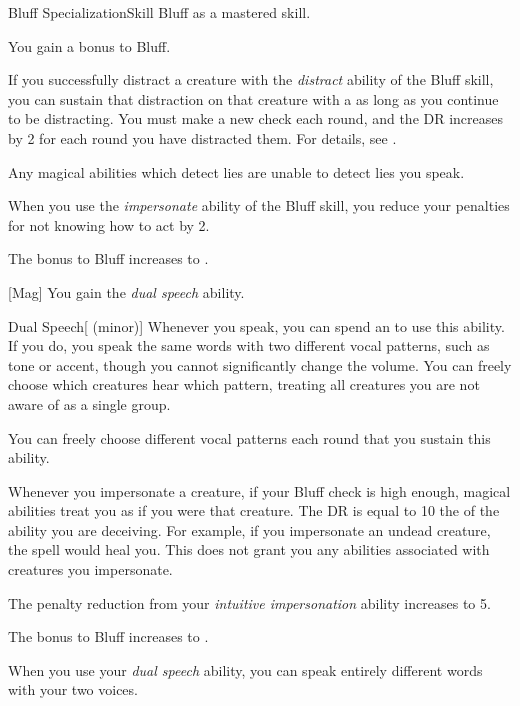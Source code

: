     \begin{feat}{Bluff Specialization}{Skill}
        \featpre Bluff as a mastered skill.

         You gain a  bonus to Bluff.

         If you successfully distract a creature with the \textit{distract} ability of the Bluff skill, you can sustain that distraction on that creature with a  as long as you continue to be distracting.
        You must make a new check each round, and the DR increases by 2 for each round you have distracted them.
        For details, see .

         Any magical abilities which detect lies are unable to detect lies you speak.

         When you use the \textit{impersonate} ability of the Bluff skill, you reduce your penalties for not knowing how to act by 2.


         The bonus to Bluff increases to .

        [Mag] You gain the \textit{dual speech} ability.
        \begin{ability}{Dual Speech}[ (minor)]
            Whenever you speak, you can spend an  to use this ability.
            If you do, you speak the same words with two different vocal patterns, such as tone or accent, though you cannot significantly change the volume.
            You can freely choose which creatures hear which pattern, treating all creatures you are not aware of as a single group.

            You can freely choose different vocal patterns each round that you sustain this ability.
        \end{ability}

         Whenever you impersonate a creature, if your Bluff check is high enough, magical abilities treat you as if you were that creature.
        The DR is equal to 10 \add the  of the ability you are deceiving.
        For example, if you impersonate an undead creature, the  spell would heal you.
        This does not grant you any abilities associated with creatures you impersonate.

         The penalty reduction from your \textit{intuitive impersonation} ability increases to 5.

         The bonus to Bluff increases to .

         When you use your \textit{dual speech} ability, you can speak entirely different words with your two voices.
    \end{feat}

